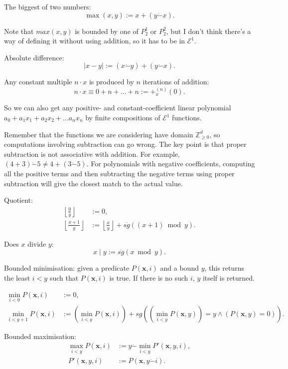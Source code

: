 \documentclass[a4paper]{article}
\newcommand{\grz}[1]{$\mathcal{E}^{#1}$}	%
\newcommand{\ZZ}{\mathbb{Z}}
\newcommand{\xvec}{\mathbf{x}}	%
\newcommand{\psub}{\dot -}	%
\newcommand{\rsg}{\overline{sg}} %
\newcommand{\recur}[1]{\begin{equation} \begin{split} #1 \end{split} \end{equation}}	%
\theoremstyle{plain}
\theoremstyle{definition}
\begin{document}
The biggest of two numbers:
\begin{equation} \max(x,y) := x + (y \psub x). \end{equation}

Note that $max(x,y)$ is bounded by one of $P_2^1$ or $P_2^2$, but I don't think there's a way of defining it without using addition, so it has to be in \grz{1}.

Absolute difference:
\begin{equation} |x - y| := (x \psub y) + (y \psub x). \end{equation}

Any constant multiple $n \cdot x$ is produced by $n$ iterations of addition:
\begin{equation} n \cdot x  \equiv 0 + n + \dots + n := +_x^{(n)}(0). \end{equation}

	So we can also get any positive- and constant-coefficient linear polynomial $a_0 + a_1x_1 + a_2x_2 + \dots a_nx_n$ by finite compositions of \grz{1} functions. 

Remember that the functions we are considering have domain $\ZZ_{\geq 0}^d$, so computations involving subtraction can go wrong. The key point is that proper subtraction is not associative with addition. For example, $(4+3) \psub 5 \neq 4+(3 \psub 5)$. For polynomials with negative coefficients, computing all the positive terms and then subtracting the negative terms using proper subtraction will give the closest match to the actual value.

Quotient:
\recur{
	\left \lfloor \frac{0}{y} \right \rfloor &:= 0, \\
	\left \lfloor \frac{x+1}{y} \right \rfloor &:= \left \lfloor \frac{x}{y} \right \rfloor + \rsg\left( (x+1) \bmod{y} \right).
}

Does $x$ divide $y$:
\begin{equation} x \mid y := \rsg( x \bmod{y} ). \end{equation}

Bounded minimisation: given a predicate $P(\xvec,i)$ and a bound $y$, this returns the least $i<y$ such that $P(\xvec,i)$ is true. If there is no such $i$, $y$ itself is returned.

\recur{
	\min_{i < 0} P(\xvec,i) &:= 0,	\\
	\min_{i < y+1} P(\xvec,i) &:= \left( \min_{i  < y} P(\xvec,i) \right) + sg\left( (\min_{i<y}P(\xvec,y))=y \wedge (P(\xvec,y) = 0) \right).
}

Bounded maximisation:
\recur{
	\max_{i < y} P(\xvec,i) &:= y \psub \min_{i < y} P'(\xvec, y, i), \\
	P'(\xvec,y,i) &:= P(\xvec, y \psub i).
}
\end{document}
